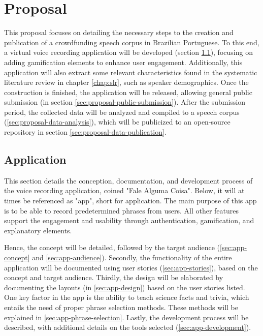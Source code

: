 \chapter[Proposal]{Proposal}
\label{chap:proposal}

This proposal focuses on detailing the necessary steps to the creation and publication of a crowdfunding speech corpus in Brazilian Portuguese. To this end, a virtual voice recording application will be developed (section \ref{sec:proposal-app}), focusing on adding gamification elements to enhance user engagement. Additionally, this application will also extract some relevant characteristics found in the systematic literature review in chapter \ref{chap:slr}, such as speaker demographics. Once the construction is finished, the application will be released, allowing general public submission (in section \ref{sec:proposal-public-submission}). After the submission period, the collected data will be analyzed and compiled to a speech corpus (\ref{sec:proposal-data-analysis}), which will be publicized to an open-source repository in section \ref{sec:proposal-data-publication}.

\section{Application}
\label{sec:proposal-app}

This section details the conception, documentation, and development process of the voice recording application, coined "Fale Alguma Coisa". Below, it will at times be referenced as "app", short for application. The main purpose of this app is to be able to record predetermined phrases from users. All other features support the engagement and usability through authentication, gamification, and explanatory elements. 

Hence, the concept will be detailed, followed by the target audience (\ref{sec:app-concept} and \ref{sec:app-audience}). Secondly, the functionality of the entire application will be documented using user stories (\ref{sec:app-stories}), based on the concept and target audience. Thirdly, the design will be elaborated by documenting the layouts (in \ref{sec:app-design}) based on the user stories listed. One key factor in the app is the ability to teach science facts and trivia, which entails the need of proper phrase selection methods. These methods will be explained in \ref{sec:app-phrase-selection}. Lastly, the development process will be described, with additional details on the tools selected (\ref{sec:app-development}).

